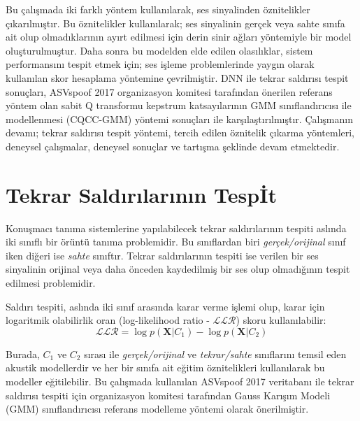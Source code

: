 \documentclass[conference, a4paper]{IEEEtran}
\begin{document}
Bu çalışmada iki farklı yöntem kullanılarak, ses sinyalinden öznitelikler çıkarılmıştır. Bu öznitelikler kullanılarak;
ses sinyalinin gerçek veya sahte sınıfa ait olup olmadıklarının ayırt edilmesi için derin sinir ağları yöntemiyle bir
model oluşturulmuştur. Daha sonra bu modelden elde edilen olasılıklar, sistem performansını tespit etmek için; ses
işleme problemlerinde yaygın olarak kullanılan skor hesaplama yöntemine çevrilmiştir. DNN ile tekrar saldırısı tespit
sonuçları, ASVspoof 2017 organizasyon komitesi tarafından önerilen referans yöntem olan sabit Q transformu kepstrum
katsayılarının GMM sınıflandırıcısı ile modellenmesi (CQCC-GMM) yöntemi sonuçları ile karşılaştırılmıştır. Çalışmanın
devamı; tekrar saldırısı tespit yöntemi, tercih edilen öznitelik çıkarma yöntemleri, deneysel çalışmalar, deneysel
sonuçlar ve tartışma şeklinde devam etmektedir.

\section{Tekrar Saldırılarının Tesp{\footnotesize İ}t{}}
Konuşmacı tanıma sistemlerine yapılabilecek tekrar saldırılarının tespiti aslında iki sınıflı bir örüntü tanıma
problemidir. Bu sınıflardan biri \emph{gerçek/orijinal} sınıf iken diğeri ise \emph{sahte} sınıftır. Tekrar
saldırılarının tespiti ise verilen bir ses sinyalinin orijinal veya daha önceden kaydedilmiş bir ses olup olmadığının
tespit edilmesi problemidir.

Saldırı tespiti, aslında iki sınıf arasında karar verme işlemi olup, karar için logaritmik olabilirlik oran
(log-likelihood ratio - $\mathcal{LLR}$) skoru kullanılabilir:
\begin{equation}
    \mathcal{LLR}=\log p(\mathbf{X}|C_1)-\log p(\mathbf{X}|C_2)
\end{equation}

Burada, $C_1$ ve $C_2$ sırası ile \emph{gerçek/orijinal} ve \emph{tekrar/sahte} sınıflarını temsil eden akustik
modellerdir ve her bir sınıfa ait eğitim öznitelikleri kullanılarak bu modeller eğitilebilir. Bu çalışmada kullanılan
ASVspoof 2017 veritabanı ile tekrar saldırısı tespiti için organizasyon komitesi tarafından Gauss Karışım Modeli (GMM)
sınıflandırıcısı referans modelleme yöntemi olarak önerilmiştir.
\end{document}

